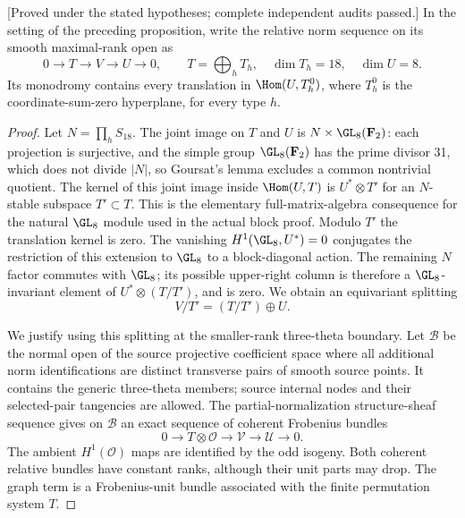 \begin{proposition}
\label{prop:nonordinary-three-torsion-gluing-hearts-candidate}
\textup{[Proved under the stated hypotheses; complete independent audits passed.]}
In the setting of the preceding proposition, write the relative
norm sequence on its smooth maximal-rank open as
\[
                    0\longrightarrow T\longrightarrow V
                       \longrightarrow U\longrightarrow0,
       \qquad T=\bigoplus_h T_h,\quad \dim T_h=18,\quad\dim U=8.
\]
Its monodromy contains every translation in
$\Hom(U,T_h^0)$, where $T_h^0$ is the coordinate-sum-zero
hyperplane, for every type $h$.
\end{proposition}
\begin{proof}
Let $N=\prod_hS_{18}$. The joint image on $T$ and $U$ is
$N\times\GL_8(\mathbf F_2)$: each projection is surjective,
and the simple group $\GL_8(\mathbf F_2)$ has the prime divisor
31, which does not divide $|N|$, so Goursat's lemma excludes
a common nontrivial quotient. The kernel of this joint image
inside $\Hom(U,T)$ is $U^*\otimes T'$ for an $N$-stable
subspace $T'\subset T$. This is the elementary full-matrix-algebra
consequence for the natural $\GL_8$ module used in the actual
block proof. Modulo $T'$ the translation kernel is zero.
The vanishing $H^1(\GL_8,U^*)=0$ conjugates the restriction
of this extension to $\GL_8$ to a block-diagonal action.
The remaining $N$ factor commutes with $\GL_8$; its possible
upper-right column is therefore a $\GL_8$-invariant element
of $U^*\otimes(T/T')$, and is zero. We obtain an equivariant
splitting
\[
                         V/T'=(T/T')\oplus U.             \tag{NTG1}
\]

We justify using this splitting at the smaller-rank three-theta
boundary. Let $\mathcal B$ be the normal open of the source
projective coefficient space where all additional norm
identifications are distinct transverse pairs of smooth source
points. It contains the generic three-theta members; source
internal nodes and their selected-pair tangencies are allowed.
The partial-normalization structure-sheaf sequence gives on
$\mathcal B$ an exact sequence of coherent Frobenius bundles
\[
                         0\to T\otimes\mathcal O
                              \to\mathcal V\to\mathcal U\to0.
\]
The ambient $H^1(\mathcal O)$ maps are identified by the odd
isogeny. Both coherent relative bundles have constant ranks,
although their unit parts may drop. The graph term is a
Frobenius-unit bundle associated with the finite \etale
permutation system $T$.


\end{proof}
